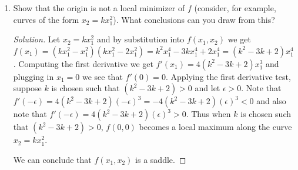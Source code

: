 \documentclass[12pt]{article}
\makeatletter
\theoremstyle{homework}
\newenvironment{exercise}[1]
{\def\@currentlabel{#1}\exercisecore}
{\endexercisecore}
\makeatother
\begin{document}
\begin{exercise}{2.7}
\begin{enumerate}
    \item[(iii)] Show that the origin is not a local minimizer of $f$ (consider, for example, curves of the form $x_2 = kx_1^2$). What conclusions 
    can you draw from this?  
    \begin{proof}[Solution] Let $x_2 = kx_1^2$ and by substitution into $f(x_1, x_2)$ we get $f(x_1) = (kx_1^2 - x_1^2)(kx_1^2 - 2x_1^2) = k^2x_1^4-3kx_1^4+2x_1^4 = (k^2-3k+2)x_1^4$.
      Computing the first derivative we get $f'(x_1) = 4(k^2-3k+2)x_1^3$ and plugging in $x_1 = 0$ we see that $f'(0) = 0$. Applying the first derivative test, suppose $k$ is chosen such that 
      $(k^2-3k+2) > 0$ and let $\epsilon > 0$. Note that $f'(-\epsilon) = 4(k^2-3k+2)(-\epsilon)^3 = -4(k^2-3k+2)(\epsilon)^3 < 0$ and also note that $f'(-\epsilon) = 4(k^2-3k+2)(\epsilon)^3 > 0$. 
      Thus when $k$ is chosen such that $(k^2-3k+2) > 0$, $f(0, 0)$ becomes a local maximum along the curve $x_2 = kx_1^2$. 

      We can conclude that $f(x_1, x_2)$ is a saddle. 
    \end{proof}
  \end{enumerate}
\end{exercise}
\vspace{.5in}
\end{document}

